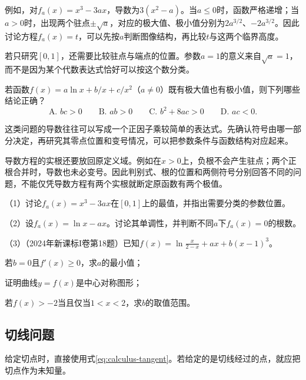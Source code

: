 例如，对\(f_a(x)=x^3-3ax\)，导数为\(3(x^2-a)\)。当\(a\le0\)时，函数严格递增；当\(a>0\)时，出现两个驻点\(\pm\sqrt a\)，对应的极大值、极小值分别为\(2a^{3/2}\)、\(-2a^{3/2}\)。因此讨论方程\(f_a(x)=t\)，可以先按\(a\)判断图像结构，再比较\(t\)与这两个临界高度。

若只研究\([0,1]\)，还需要比较驻点与端点的位置。参数\(a=1\)的意义来自\(\sqrt a=1\)，而不是因为某个代数表达式恰好可以按这个数分类。

\begin{example}[2023年新课标II卷第11题]
若函数\(f(x)=a\ln x+b/x+c/x^2\)（\(a\ne0\)）既有极大值也有极小值，则下列哪些结论正确？
\begin{equation*}
 \text{A. }bc>0\qquad \text{B. }ab>0\qquad
 \text{C. }b^2+8ac>0\qquad \text{D. }ac<0.
\end{equation*}
\end{example}

这类问题的导数往往可以写成一个正因子乘较简单的表达式。先确认符号由哪一部分决定，再研究其零点位置和变号情况，可以把参数条件与函数结构对应起来。

导数方程的实根还要放回原定义域。例如在\(x>0\)上，负根不会产生驻点；两个正根合并时，导数也未必变号。因此判别式、根的位置和两侧符号分别回答不同的问题，不能仅凭导数方程有两个实根就断定原函数有两个极值。

\begin{exercise}\label{exs:calculus-parameter-gaokao}
\mbox{}\par\nobreak

（1）讨论\(f_a(x)=x^3-3ax\)在\([0,1]\)上的最值，并指出需要分类的参数位置。

（2）设\(f_a(x)=\ln x-ax\)。讨论其单调性，并判断不同\(a\)下\(f_a(x)=0\)的根数。

（3）（2024年新课标I卷第18题）已知\(f(x)=\ln\frac{x}{2-x}+ax+b(x-1)^3\)。

若\(b=0\)且\(f'(x)\ge0\)，求\(a\)的最小值；

证明曲线\(y=f(x)\)是中心对称图形；

若\(f(x)>-2\)当且仅当\(1<x<2\)，求\(b\)的取值范围。
\end{exercise}

\subsection{切线问题}

给定切点时，直接使用式\eqref{eq:calculus-tangent}。若给定的是切线经过的点，就应把切点作为未知量。

